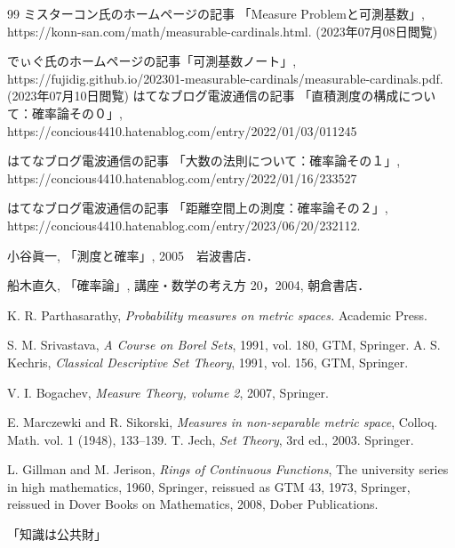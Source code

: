 \documentclass[leqno, 12pt]{jsarticle}
\begin{document}
\begin{thebibliography}{99}
ミスターコン氏のホームページの記事
「Measure Problemと可測基数」, 
https://konn-san.com/math/measurable-cardinals.html. 
(2023年07月08日閲覧)

でぃぐ氏のホームページの記事「可測基数ノート」, 
https://fujidig.github.io/202301-measurable-cardinals/measurable-cardinals.pdf. 
(2023年07月10日閲覧)
はてなブログ電波通信の記事
「直積測度の構成について：確率論その０」, 
https://concious4410.hatenablog.com/entry/2022/01/03/011245

はてなブログ電波通信の記事
「大数の法則について：確率論その１」, 
https://concious4410.hatenablog.com/entry/2022/01/16/233527


はてなブログ電波通信の記事
「距離空間上の測度：確率論その２」, 
https://concious4410.hatenablog.com/entry/2023/06/20/232112.





小谷眞一, 「測度と確率」, 2005　岩波書店．

船木直久, 「確率論」, 
講座・数学の考え方 20，2004, 朝倉書店．

K. R. Parthasarathy,  
\textit{Probability measures on metric spaces.} 
Academic Press. 

S. M. Srivastava,
\textit{A Course on Borel Sets}, 
1991, 
vol. 180, GTM, Springer. 
A. S. Kechris, 
\textit{Classical Descriptive Set Theory}, 
1991, 
vol. 156, GTM, Springer. 

V. I. Bogachev, 
\textit{Measure Theory, volume 2}, 
2007, Springer. 

E. Marczewki and R. Sikorski, 
\textit{Measures in non-separable metric space}, 
Colloq. Math. vol. 1 (1948), 
133--139.
T. Jech, 
\textit{Set Theory}, 3rd ed., 
2003. Springer. 

L. Gillman and M. Jerison, 
\textit{Rings of Continuous Functions}, 
The university series in high mathematics, 1960, Springer, 
reissued as 
GTM 43, 1973,  Springer,
reissued in 
Dover Books on Mathematics, 
2008, 
Dober Publications. 
\end{thebibliography}

「知識は公共財」


			
\end{document}
